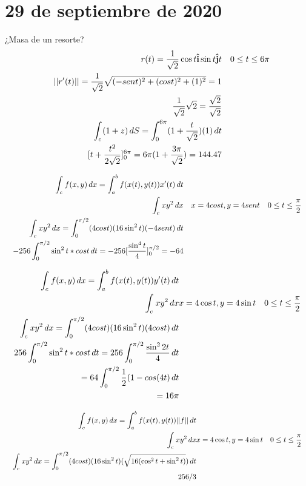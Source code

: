 \section{29 de septiembre de 2020}

\begin{exercise}
¿Masa de un resorte?
\begin{align}
    && r(t)=\frac{1}{\sqrt{2}}\cos t\boldsymbol{\hat{\textbf{i}}}\sin t\boldsymbol{\hat{\textbf{j}}}{t} &&& 0\leq t \leq 6\pi\\ 
    && ||r'(t)||=\frac{1}{\sqrt{2}}\sqrt{(-sent)^2+(cost)^2 +(1)^2}=1 &&\\
    && \frac{1}{\sqrt{2}}\sqrt{2}= \frac{\sqrt{2}}{\sqrt{2}} &&\\
    && \int_{c}^{} (1+z) \, d{S}=\int_{0}^{6\pi} (1+\frac{t}{\sqrt{2}})(1) \, d{t} &&\\
    && [t +\frac{t^2}{2\sqrt{2}}]_0^{6\pi}= 6\pi(1+\frac{3\pi}{\sqrt{2}})=144.47 &&
\end{align}
\end{exercise}

\begin{exercise}

\begin{align}
    && \int_{c}^{} f(x,y) \, d{x}=\int_{a}^{b} f(x(t),y(t))x'(t) \, d{t} &&\\
    && \int_{c}^{} xy^2 \, d{x} &&& x=4cost,y=4sent & 0\leq t\leq \frac{\pi}{2}&\\
    && \int_{c}^{} xy^2 \, d{x}=\int_{0}^{\pi/2} (4cost)(16\sin^2 t)(-4sent) \, d{t} &&\\
    && -256\int_{0}^{\pi/2} \sin^2t*cost \, d{t}=-256[\frac{\sin^4 t}{4}]_0^{\pi/2}=-64 &&
\end{align}
\end{exercise}

\begin{exercise}
\begin{align}
    && \int_{c}^{} f(x,y) \, d{x}=\int_{a}^{b} f(x(t),y(t))y'(t) \, d{t} &&\\
    && \int_{c}^{} xy^2 \, d{x} & x=4\cos t,y=4\sin t & 0\leq t\leq \frac{\pi}{2} &&\\
    && \int_{c}^{} xy^2 \, d{x}=\int_{0}^{\pi/2} (4cost)(16\sin^2 t)(4cost) \, d{t} &&\\
    && 256\int_{0}^{\pi/2} \sin^2t*cost \, d{t}=256\int_{0}^{\pi/2} \frac{\sin^2 2t}{4} \, d{t}\\
    && =64\int_{0}^{\pi/2} \frac{1}{2}(1-cos(4t) \, d{t} && &&\\
    && =16\pi &&
\end{align}
\end{exercise}

\begin{exercise}
\begin{align}
    && \int_{c}^{} f(x,y) \, d{x}=\int_{a}^{b} f(x(t),y(t))||f|| \, d{t} &&\\
    && \int_{c}^{} xy^2 \, d{x} & x=4\cos t,y=4\sin t & 0\leq t\leq \frac{\pi}{2} &&\\
    && \int_{c}^{} xy^2 \, d{x}=\int_{0}^{\pi/2} (4cost)(16\sin^2 t)(\sqrt{16(\cos^2 t+\sin^2 t)}) \, d{t} &&\\
    && 256/3 &&
\end{align}
\end{exercise}

